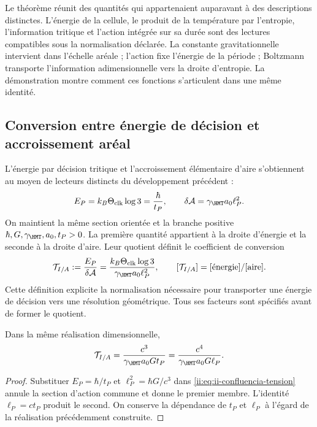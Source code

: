 Le théorème réunit des quantités qui appartenaient auparavant à des descriptions
distinctes. L’énergie de la cellule, le produit de la température par l’entropie,
l’information tritique et l’action intégrée sur sa durée sont
des lectures compatibles sous la normalisation déclarée. La constante
gravitationnelle intervient dans l’échelle aréale ; l’action fixe l’énergie
de la période ; Boltzmann transporte l’information adimensionnelle vers la
droite d’entropie. La démonstration montre comment ces fonctions
s’articulent dans une même identité.

\subsection{Conversion entre énergie de décision et accroissement aréal}
\label{ii:sec:ii-conversion-informacion-area}

L’énergie par décision tritique et l’accroissement élémentaire d’aire
s’obtiennent au moyen de lecteurs distincts du développement précédent :
\begin{equation}
 E_P=k_B\Theta_{\rm clk}\log3=\frac{\hbar}{t_P},
 \qquad
 \delta\mathcal A=\gamma_{\HMT}a_0\ell_P^2.
 \label{ii:eq:ii-confluencia-cuanto-energia-area}
\end{equation}
On maintient la même section orientée et la branche positive
\(\hbar,G,\gamma_{\HMT},a_0,t_P>0\). La première quantité
appartient à la droite d’énergie et la seconde à la droite d’aire.
Leur quotient définit le coefficient de conversion
\begin{equation}
 \mathcal T_{I/A}
 :=\frac{E_P}{\delta\mathcal A}
 =\frac{k_B\Theta_{\rm clk}\log3}
        {\gamma_{\HMT}a_0\ell_P^2},
 \qquad [\mathcal T_{I/A}]=[\text{énergie}]/[\text{aire}].
 \label{ii:eq:ii-confluencia-tension}
\end{equation}
Cette définition explicite la normalisation nécessaire pour transporter
une énergie de décision vers une résolution géométrique. Tous ses facteurs
sont spécifiés avant de former le quotient.

\begin{proposition}
\label{ii:prop:ii-confluencia-tension}
Dans la même réalisation dimensionnelle,
\begin{equation}
 \mathcal T_{I/A}
 =\frac{c^3}{\gamma_{\HMT}a_0G t_P}
 =\frac{c^4}{\gamma_{\HMT}a_0G\ell_P}.
 \label{ii:eq:ii-confluencia-tension-gravedad}
\end{equation}
\end{proposition}
\begin{proof}
Substituer \(E_P=\hbar/t_P\) et \(\ell_P^2=\hbar G/c^3\)
dans \eqref{ii:eq:ii-confluencia-tension} annule la section d’action
commune et donne le premier membre. L’identité \(\ell_P=ct_P\)
produit le second. On conserve la dépendance de \(t_P\) et
\(\ell_P\) à l’égard de la réalisation précédemment construite.
\end{proof}

